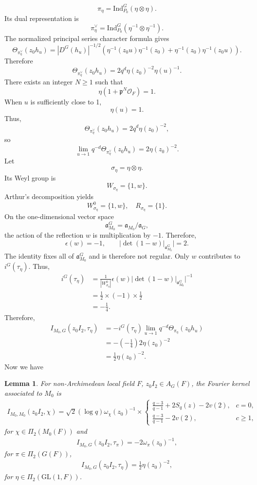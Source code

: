 \documentclass[11pt]{amsart}
\newtheorem {lemma}      [theorem]    {Lemma}
\renewcommand{\rm}{\mathrm}
\newcommand{\GGL}{\mathrm{GL}}
\theoremstyle{definition}
\numberwithin{equation}{section}
\begin{document}
	\[
	\pi_\eta = \rm{Ind}_{P_0}^G(\eta \otimes \eta).
	\]
	Its dual representation is
	\[
	\pi_\eta^\vee = \rm{Ind}_{P_0}^G(\eta^{-1} \otimes \eta^{-1}).
	\]
	The normalized principal series character formula gives
	\[
	\Theta_{\pi^\vee_\eta}(z_0h_u) = |D^G(h_u)|^{-1/2} (\eta^{-1}(z_0 u)\eta^{-1}(z_0) + \eta^{-1}(z_0)\eta^{-1}(z_0 u)).
	\]
	Therefore
	\[
	\Theta_{\pi^\vee_\eta}(z_0h_u) = 2q^d \eta(z_0)^{-2}\eta(u)^{-1}.
	\]
	There exists an integer \(N \ge 1\) such that
	\[
	\eta(1+\mathfrak{p}^N\mathcal{O}_F) = 1.
	\]
	When \(u\) is sufficiently close to 1,
	\[
	\eta(u) = 1.
	\]
	Thus,
	\[
	\Theta_{\pi^\vee_\eta}(z_0h_u) = 2q^d \eta(z_0)^{-2},
	\]
	so
	\[
	\lim_{u \to 1} q^{-d} \Theta_{\pi^\vee_\eta}(z_0h_u) = 2\eta(z_0)^{-2}.
	\]
	Let
	\[
	\sigma_\eta = \eta \otimes \eta.
	\]
	Its Weyl group is
	\[
	W_{\sigma_\eta} = \{1, w\}.
	\]
	Arthur's decomposition yields
	\[
	W_{\sigma_\eta}^0 = \{1, w\}, \quad R_{\sigma_\eta} = \{1\}.
	\]
	On the one-dimensional vector space
	\[
	\mathfrak{a}_{M_0}^G = \mathfrak{a}_{M_0} / \mathfrak{a}_G,
	\]
	the action of the reflection \(w\) is multiplication by \(-1\). Therefore,
	\[
	\epsilon(w) = -1,\qquad |\det(1-w)|_{\mathfrak{a}_{M_0}^G}| = 2.
	\]
	The identity fixes all of $\mathfrak a_{M_0}^G$ and is therefore not regular. Only \(w\) contributes to \(i^G(\tau_\eta)\). Thus,
	\[
	\begin{aligned}
		i^G(\tau_\eta) &= \frac{1}{|W_{\sigma_\eta}^0|} \epsilon(w) |\det(1-w)|_{\mathfrak{a}_{M_0}^G}|^{-1} \\
		&= \frac{1}{2}\times (-1) \times\frac{1}{2} \\
		&= -\frac{1}{4}.
	\end{aligned}
	\]
	Therefore,
	\begin{align*}
		I_{M_0,G}(z_0I_2, \tau_\eta) &= -i^G(\tau_\eta) \lim_{u \to 1} q^{-d} \Theta_{\pi_\eta}(z_0h_u) \\
		&= -\left(-\frac{1}{4}\right) 2\eta(z_0)^{-2} \\
		&= \frac{1}{2}\eta(z_0)^{-2}.
	\end{align*}
	Now we have
	\begin{lemma}
		For non-Archimedean local field \(F\), \(z_0I_2\in A_G(F)\), the Fourier kernel associated to \(M_0\) is 
		\begin{align*}
			I_{M_0,M_0}(z_0I_2,\chi)=\sqrt{2}(\log q) \omega_\chi(z_0)^{-1} \times\begin{cases} \frac{q-3}{q-1} + 2S_q(z) - 2v(2), & c=0, \\ \frac{q-3}{q-1} - 2v(2), & c \ge 1, \end{cases}
		\end{align*}for \(\chi\in \Pi_2(M_0(F))\) and 
		\begin{align*}
			I_{M_0,G}(z_0I_2, \tau_\pi) = -2\omega_\pi(z_0)^{-1},
		\end{align*}for \(\pi\in \Pi_2(G(F))\),
		\begin{align*}
			I_{M_0,G}(z_0I_2, \tau_\eta) =\frac{1}{2}\eta(z_0)^{-2},
		\end{align*}for \(\eta\in \Pi_2(\GGL(1,F))\). 
	\end{lemma}
	
\end{document}
